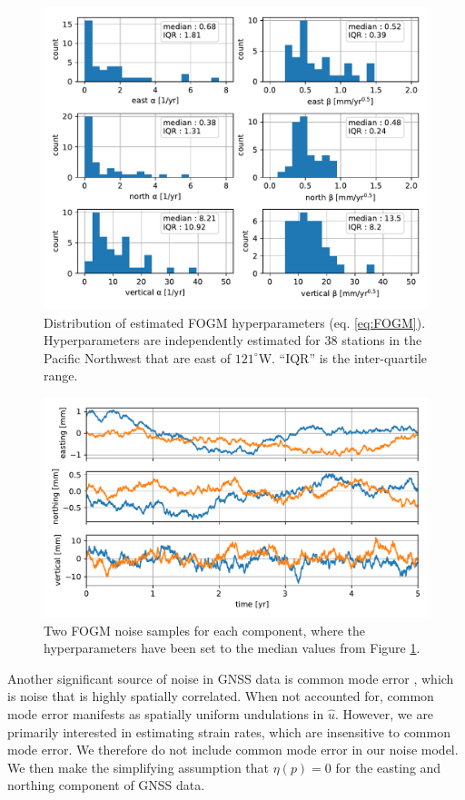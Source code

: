 \documentclass[10pt,letter]{article}
\begin{document}
\begin{figure}
\includegraphics{figures/noise/noise-params.pdf}
\caption{Distribution of estimated FOGM hyperparameters (eq. \ref{eq:FOGM}).  Hyperparameters are independently estimated for 38 stations in the Pacific Northwest that are east of $121^\circ$W. ``IQR'' is the inter-quartile range.}   
\label{fig:NoiseParams}
\end{figure}

\begin{figure}
\includegraphics{figures/noise/noise-samples.pdf}
\caption{Two FOGM noise samples for each component, where the hyperparameters have been set to the median values from Figure \ref{fig:NoiseParams}.}   
\label{fig:NoiseSamples}
\end{figure}

Another significant source of noise in GNSS data is common mode error \citep[e.g.,][]{Wdowinski1997,Dong2006}, which is noise that is highly spatially correlated. When not accounted for, common mode error manifests as spatially uniform undulations in $\hat{u}$. However, we are primarily interested in estimating strain rates, which are insensitive to common mode error. We therefore do not include common mode error in our noise model. We then make the simplifying assumption that $\eta(p) = 0$ for the easting and northing component of GNSS data.            
\end{document}
